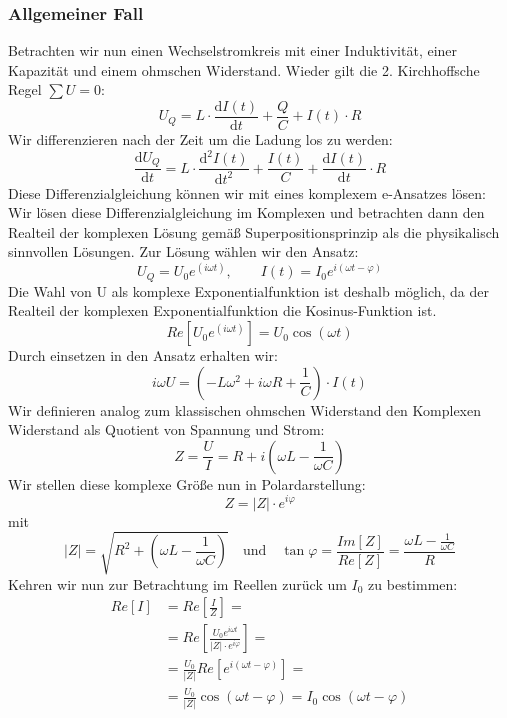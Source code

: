 \subsubsection{Allgemeiner Fall}
Betrachten wir nun einen Wechselstromkreis mit einer Induktivität, einer Kapazität und einem ohmschen Widerstand. Wieder gilt die 2. Kirchhoffsche Regel $\sum U = 0$:
\begin{equation}
U_Q = L \cdot \frac{\mathrm{d}I(t)}{\mathrm{d}t} + \frac{Q}{C} + I(t) \cdot R
\end{equation}
Wir differenzieren nach der Zeit um die Ladung los zu werden:
\begin{equation}
\frac{\mathrm dU_Q}{\mathrm dt} = L \cdot \frac{\mathrm{d^2}I(t)}{\mathrm{d}t^2} + \frac{I(t)}{C} + \frac{\mathrm dI(t)}{\mathrm dt} \cdot R
\end{equation}
Diese Differenzialgleichung können wir mit eines komplexem e-Ansatzes lösen:
Wir lösen diese Differenzialgleichung im Komplexen und betrachten dann den Realteil der komplexen Lösung gemäß Superpositionsprinzip als die physikalisch sinnvollen Lösungen. Zur Lösung  wählen wir den Ansatz:
\begin{equation}
U_Q = U_0 e^{(i\omega t)},	\qquad	I(t) = I_0 e^{i(\omega t-\varphi)}
\end{equation}
Die Wahl von U als komplexe Exponentialfunktion ist deshalb möglich, da der Realteil der komplexen Exponentialfunktion die Kosinus-Funktion ist.
\begin{equation}
Re\left[ U_0 e^{(i\omega t)}\right]  = U_0 \cos{(\omega t)}
\end{equation}
Durch einsetzen in den Ansatz erhalten wir:
\begin{equation}
i\omega U = (- L \omega^2 + i \omega R  + \frac{1}{C}) \cdot I(t)
\end{equation}
Wir definieren analog zum klassischen ohmschen Widerstand den Komplexen Widerstand als Quotient von Spannung und Strom:
\begin{equation}
Z = \frac{U}{I} = R + i ( \omega L - \frac{1}{\omega C})
\end{equation}
Wir stellen diese komplexe Größe nun in Polardarstellung:
\begin{equation}
Z = |Z| \cdot e^{i\varphi}
\end{equation}
mit
\begin{equation}\label{Zpolar}
|Z| = \sqrt{ R^2 + \left( \omega L - \frac{1}{\omega C} \right) }\quad {\mathrm{und}} \quad \tan\varphi = \frac{Im[Z]}{Re[Z]} = \frac{\omega L - \frac{1}{\omega C}}{R}
\end{equation}
Kehren wir nun zur Betrachtung im Reellen zurück um $I_0$ zu bestimmen:
\begin{align}
\nonumber
Re\left[ I \right]
&= Re\left[ \frac{I}{Z} \right] =\\\nonumber
&= Re\left[ \frac{U_0 e^{i\omega t}}{|Z|\cdot e^{i\varphi}} \right] =\\\nonumber
&= \frac{U_0}{|Z|} Re\left[ e^{i(\omega t - \varphi)} \right] =\\
&= \frac{U_0}{|Z|} \cos(\omega t - \varphi) = I_0 \cos(\omega t - \varphi)
\end{align}

